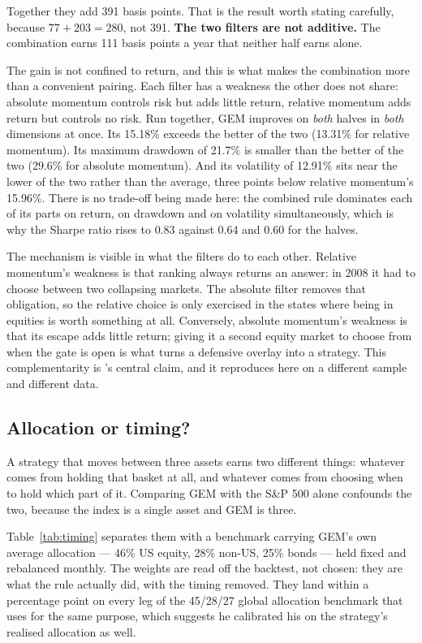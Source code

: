 \documentclass[11pt,a4paper]{article}
\begin{document}
Together they add 391 basis points. That is the result worth stating carefully,
because $77 + 203 = 280$, not 391. \textbf{The two filters are not additive.}
The combination earns 111 basis points a year that neither half earns alone.

The gain is not confined to return, and this is what makes the combination more
than a convenient pairing. Each filter has a weakness the other does not share:
absolute momentum controls risk but adds little return, relative momentum adds
return but controls no risk. Run together, GEM improves on \emph{both} halves in
\emph{both} dimensions at once. Its 15.18\% exceeds the better of the two
(13.31\% for relative momentum). Its maximum drawdown of 21.7\% is smaller than
the better of the two (29.6\% for absolute momentum). And its volatility of
12.91\% sits near the lower of the two rather than the average, three points
below relative momentum's 15.96\%. There is no trade-off being made here: the
combined rule dominates each of its parts on return, on drawdown and on
volatility simultaneously, which is why the Sharpe ratio rises to 0.83 against
0.64 and 0.60 for the halves.

The mechanism is visible in what the filters do to each other. Relative
momentum's weakness is that ranking always returns an answer: in 2008 it had to
choose between two collapsing markets. The absolute filter removes that
obligation, so the relative choice is only exercised in the states where being
in equities is worth something at all. Conversely, absolute momentum's weakness
is that its escape adds little return; giving it a second equity market to
choose from when the gate is open is what turns a defensive overlay into a
strategy. This complementarity is \citeauthor{antonacci2016}'s central claim,
and it reproduces here on a different sample and different data.

\subsection{Allocation or timing?}

A strategy that moves between three assets earns two different things: whatever
comes from holding that basket at all, and whatever comes from choosing when to
hold which part of it. Comparing GEM with the S\&P 500 alone confounds the two,
because the index is a single asset and GEM is three.

Table~\ref{tab:timing} separates them with a benchmark carrying GEM's own
average allocation --- 46\% US equity, 28\% non-US, 25\% bonds --- held fixed
and rebalanced monthly. The weights are read off the backtest, not chosen: they
are what the rule actually did, with the timing removed. They land within a
percentage point on every leg of the 45/28/27 global allocation benchmark that
\citet{antonacci2018} uses for the same purpose, which suggests he calibrated
his on the strategy's realised allocation as well.
\end{document}
